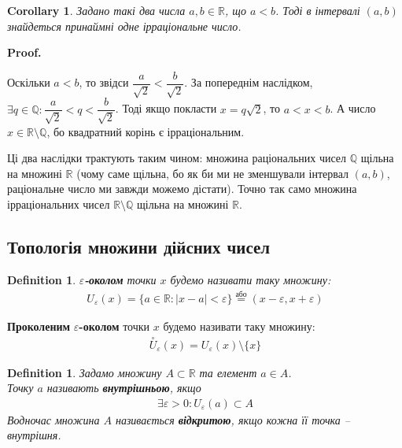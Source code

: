\documentclass[a4paper, 14pt]{article}
\makeatletter
\def\qed{$\blacksquare$}
\theoremstyle{theoremdd}
\theoremstyle{theoremdd}
\newtheorem{definition}[theorem]{Definition}
\theoremstyle{theoremdd}
\theoremstyle{theoremdd}
\theoremstyle{theoremdd}
\theoremstyle{theoremdd}
\theoremstyle{theoremdd}
\theoremstyle{theoremdd}
\newtheorem{corollary}[theorem]{Corollary}
\renewenvironment{proof}[1][Proof.\\]{\par
\pushQED{\hfill \qed}%
\normalfont \topsep6\p@\@plus6\p@\relax
\trivlist
\item\relax
{\bfseries
#1\@addpunct{.}}\hspace\labelsep\ignorespaces
}{%
\popQED\endtrivlist\@endpefalse
}
\makeatother
\begin{document}
	\begin{corollary}
	Задано такі два числа $a,b \in \mathbb{R}$, що $a < b$. Тоді в інтервалі $(a,b)$ знайдеться принаймні одне ірраціональне число.
	\end{corollary}
	
	\begin{proof}
	Оскільки $a < b$, то звідси $\dfrac{a}{\sqrt{2}} < \dfrac{b}{\sqrt{2}}$. За попереднім наслідком, $\exists q \in \mathbb{Q}: \dfrac{a}{\sqrt{2}} < q < \dfrac{b}{\sqrt{2}}$. Тоді якщо покласти $x = q \sqrt{2}$, то $a < x < b$. А число $x \in \mathbb{R} \setminus \mathbb{Q}$, бо квадратний корінь є ірраціональним.
	\end{proof}
	
	Ці два наслідки трактують таким чином: множина раціональних чисел $\mathbb{Q}$ щільна на множині $\mathbb{R}$ (чому саме щільна, бо як би ми не зменшували інтервал $(a,b)$, раціональне число ми завжди можемо дістати). Точно так само множина ірраціональних чисел $\mathbb{R} \setminus \mathbb{Q}$ щільна на множині $\mathbb{R}$.
	
	\subsection{Топологія множини дійсних чисел}
	\begin{definition}
	$\varepsilon$\textbf{-околом} точки $x$ будемо називати таку множину:
	\begin{align*}
	U_{\varepsilon}(x) = \{a \in \mathbb{R}: |x-a| < \varepsilon \} \overset{\text{або}}{=} (x-\varepsilon,x+\varepsilon)
	\end{align*}
	\end{definition}
	
	\begin{figure}[H]
	\centering
	\end{figure}
	\textbf{Проколеним} $\varepsilon$\textbf{-околом} точки $x$ будемо називати таку множину:
	\begin{align*}
	\overset{\circ}{U}_{\varepsilon}(x) = U_{\varepsilon}(x) \setminus \{x\}
	\end{align*}
\begin{definition}
Задамо множину $A \subset \mathbb{R}$ та елемент $a \in A$.\\
Точку $a$ називають \textbf{внутрішньою}, якщо
\begin{align*}
\exists \varepsilon > 0: U_{\varepsilon}(a) \subset A
\end{align*}
Водночас множина $A$ називається \textbf{відкритою}, якщо кожна її точка -- внутрішня.
\end{definition}
\end{document}
